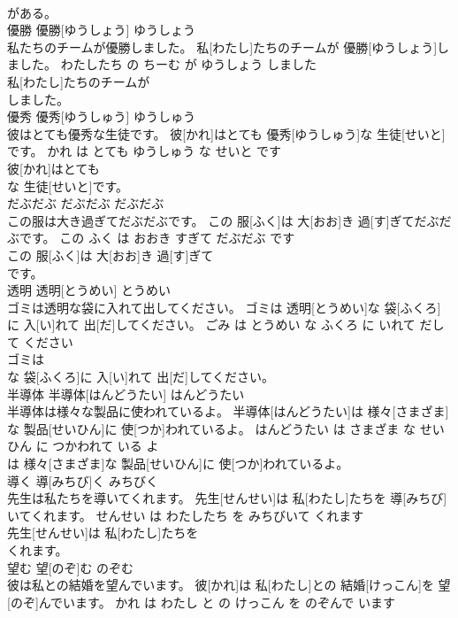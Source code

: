 \documentclass[8pt]{extreport}
\begin{document}
\begin{CJK}{UTF8}{min}
\\	がある。			
\\	優勝	優勝[ゆうしょう]	ゆうしょう	
\\	私たちのチームが優勝しました。	私[わたし]たちのチームが 優勝[ゆうしょう]しました。	わたしたち の ちーむ が ゆうしょう しました	
\\	私[わたし]たちのチームが
\\	しました。			
\\	優秀	優秀[ゆうしゅう]	ゆうしゅう	
\\	彼はとても優秀な生徒です。	彼[かれ]はとても 優秀[ゆうしゅう]な 生徒[せいと]です。	かれ は とても ゆうしゅう な せいと です	
\\	彼[かれ]はとても
\\	な 生徒[せいと]です。			
\\	だぶだぶ	だぶだぶ	だぶだぶ	
\\	この服は大き過ぎてだぶだぶです。	この 服[ふく]は 大[おお]き 過[す]ぎてだぶだぶです。	この ふく は おおき すぎて だぶだぶ です	
\\	この 服[ふく]は 大[おお]き 過[す]ぎて
\\	です。			
\\	透明	透明[とうめい]	とうめい	
\\	ゴミは透明な袋に入れて出してください。	ゴミは 透明[とうめい]な 袋[ふくろ]に 入[い]れて 出[だ]してください。	ごみ は とうめい な ふくろ に いれて だして ください	
\\	ゴミは
\\	な 袋[ふくろ]に 入[い]れて 出[だ]してください。			
\\	半導体	半導体[はんどうたい]	はんどうたい	
\\	半導体は様々な製品に使われているよ。	半導体[はんどうたい]は 様々[さまざま]な 製品[せいひん]に 使[つか]われているよ。	はんどうたい は さまざま な せいひん に つかわれて いる よ	
\\	は 様々[さまざま]な 製品[せいひん]に 使[つか]われているよ。			
\\	導く	導[みちび]く	みちびく	
\\	先生は私たちを導いてくれます。	先生[せんせい]は 私[わたし]たちを 導[みちび]いてくれます。	せんせい は わたしたち を みちびいて くれます	
\\	先生[せんせい]は 私[わたし]たちを
\\	くれます。			
\\	望む	望[のぞ]む	のぞむ	
\\	彼は私との結婚を望んでいます。	彼[かれ]は 私[わたし]との 結婚[けっこん]を 望[のぞ]んでいます。	かれ は わたし と の けっこん を のぞんで います	

\end{CJK}
\end{document}
